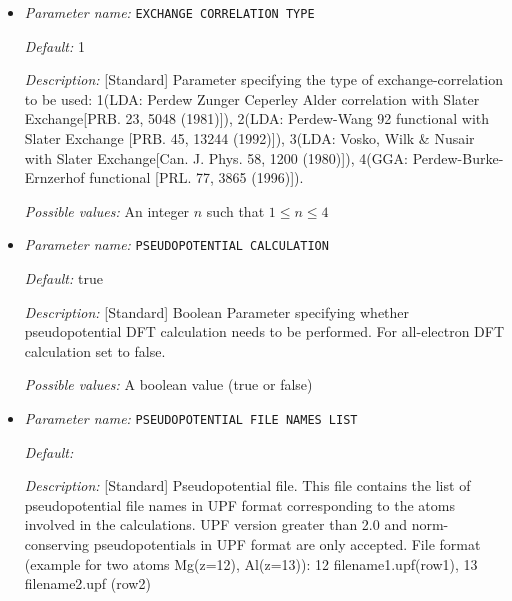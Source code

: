\begin{itemize}
\item {\it Parameter name:} {\tt EXCHANGE CORRELATION TYPE}
\label{parameters:DFT functional parameters/EXCHANGE CORRELATION TYPE}
\label{parameters:DFT_20functional_20parameters/EXCHANGE_20CORRELATION_20TYPE}




{\it Default:} 1


{\it Description:} [Standard] Parameter specifying the type of exchange-correlation to be used: 1(LDA: Perdew Zunger Ceperley Alder correlation with Slater Exchange[PRB. 23, 5048 (1981)]), 2(LDA: Perdew-Wang 92 functional with Slater Exchange [PRB. 45, 13244 (1992)]), 3(LDA: Vosko, Wilk \& Nusair with Slater Exchange[Can. J. Phys. 58, 1200 (1980)]), 4(GGA: Perdew-Burke-Ernzerhof functional [PRL. 77, 3865 (1996)]).


{\it Possible values:} An integer $n$ such that $1\leq n \leq 4$
\item {\it Parameter name:} {\tt PSEUDOPOTENTIAL CALCULATION}
\label{parameters:DFT functional parameters/PSEUDOPOTENTIAL CALCULATION}
\label{parameters:DFT_20functional_20parameters/PSEUDOPOTENTIAL_20CALCULATION}




{\it Default:} true


{\it Description:} [Standard] Boolean Parameter specifying whether pseudopotential DFT calculation needs to be performed. For all-electron DFT calculation set to false.


{\it Possible values:} A boolean value (true or false)
\item {\it Parameter name:} {\tt PSEUDOPOTENTIAL FILE NAMES LIST}
\label{parameters:DFT functional parameters/PSEUDOPOTENTIAL FILE NAMES LIST}
\label{parameters:DFT_20functional_20parameters/PSEUDOPOTENTIAL_20FILE_20NAMES_20LIST}




{\it Default:} 


{\it Description:} [Standard] Pseudopotential file. This file contains the list of pseudopotential file names in UPF format corresponding to the atoms involved in the calculations. UPF version greater than 2.0 and norm-conserving pseudopotentials in UPF format are only accepted. File format (example for two atoms Mg(z=12), Al(z=13)): 12 filename1.upf(row1), 13 filename2.upf (row2)



\end{itemize}
